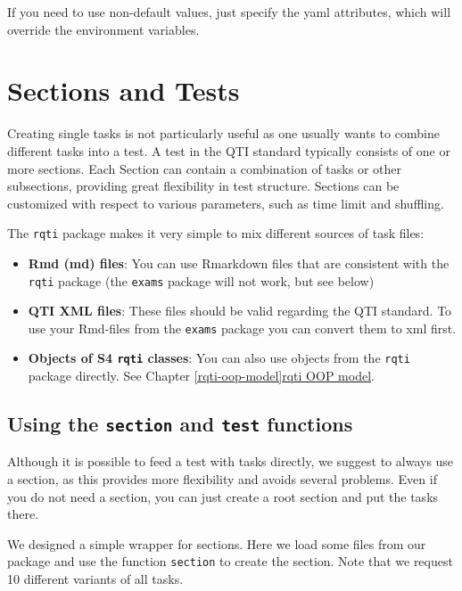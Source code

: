\documentclass[twoside]{tufte-book}
\providecommand{\tightlist}{%
  \setlength{\itemsep}{0pt}\setlength{\parskip}{0pt}}
\begin{document}
If you need to use non-default values, just specify the yaml attributes, which will override the environment variables.

\chapter{Sections and Tests}\label{sections-and-tests}

Creating single tasks is not particularly useful as one usually wants to combine different tasks into a test. A test in the QTI standard typically consists of one or more sections. Each Section can contain a combination of tasks or other subsections, providing great flexibility in test structure. Sections can be customized with respect to various parameters, such as time limit and shuffling.

The \texttt{rqti} package makes it very simple to mix different sources of task files:

\begin{itemize}
\tightlist
\item
  \textbf{Rmd (md) files}: You can use Rmarkdown files that are consistent with the \texttt{rqti} package (the \texttt{exams} package will not work, but see below)
\item
  \textbf{QTI XML files}: These files should be valid regarding the QTI standard. To use your Rmd-files from the \texttt{exams} package you can convert them to xml first.
\item
  \textbf{Objects of S4 \texttt{rqti} classes}: You can also use objects from the \texttt{rqti} package directly. See Chapter \ref{rqti-oop-model}\href{rqti_oop_model.html}{rqti OOP model}.
\end{itemize}

\section{\texorpdfstring{Using the \texttt{section} and \texttt{test} functions}{Using the section and test functions}}\label{using-the-section-and-test-functions}

Although it is possible to feed a test with tasks directly, we suggest to always use a section, as this provides more flexibility and avoids several problems. Even if you do not need a section, you can just create a root section and put the tasks there.

We designed a simple wrapper for sections. Here we load some files from our package and use the function \texttt{section} to create the section. Note that we request 10 different variants of all tasks.
\end{document}
